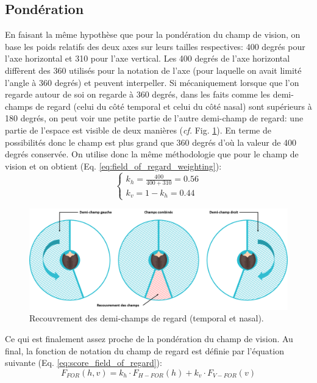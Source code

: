 	\subsection{Pondération}
	\par En faisant la même hypothèse que pour la pondération du champ de vision, on base les poids relatifs des deux axes sur leurs tailles respectives: 400 degrés pour l'axe horizontal et 310 pour l'axe vertical. Les 400 degrés de l'axe horizontal diffèrent des 360 utilisés pour la notation de l'axe (pour laquelle on avait limité l'angle à 360 degrés) et peuvent interpeller. Si mécaniquement lorsque que l'on regarde autour de soi on regarde à 360 degrés, dans les faits comme les demi-champs de regard (celui du côté temporal et celui du côté nasal) sont supérieurs à 180 degrés, on peut voir une petite partie de l'autre demi-champ de regard: une partie de l'espace est visible de deux manières (\textit{cf.} Fig. \ref{fig:demi_champs_regard}). En terme de possibilités donc le champ est plus grand que 360 degrés d'où la valeur de 400 degrés conservée. On utilise donc la même méthodologie que pour le champ de vision et on obtient (Eq. \ref{eq:field_of_regard_weighting}):
	\begin{equation}
	\begin{cases}
		k_h = \frac{400}{400 + 310} = 0.56\\
		k_v = 1 - k_h = 0.44
	\end{cases}
	\label{eq:field_of_regard_weighting}
	\end{equation}
	
	\begin{figure}
		\centering
		\includegraphics[scale=.35]{Figures/RecouvrementFOR}
		\caption{Recouvrement des demi-champs de regard (temporal et nasal).}
		\label{fig:demi_champs_regard}
	\end{figure}
	
	\par Ce qui est finalement assez proche de la pondération du champ de vision. Au final, la fonction de notation du champ de regard est définie par l'équation suivante (Eq. \ref{eq:score_field_of_regard}):
	\begin{equation}
	F_{FOR}(h,v) = k_h \cdot F_{H-FOR}(h) + k_v \cdot F_{V-FOR}(v)
	\label{eq:score_field_of_regard}
	\end{equation}
	
